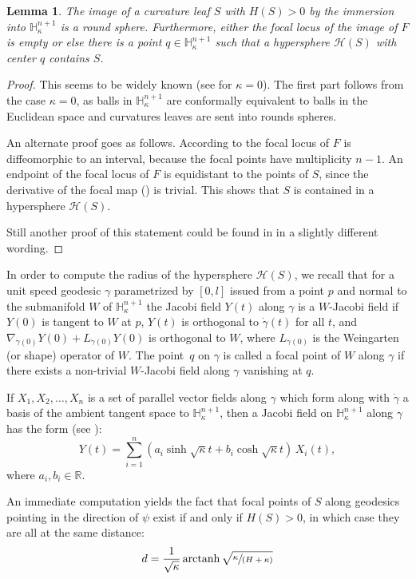 \documentclass[10pt]{amsart}
\let\mathcal\mathscr
\DeclareMathOperator{\arctanh}{arctanh}
\newcommand{\spfrac}[2]{\sfrac{#1}{(#2)}}
\newtheorem{lemma}[theorem]{Lemma}
\theoremstyle{definition}
\theoremstyle{remark}
\numberwithin{equation}{section}
\begin{document}
\begin{lemma}
The image of a curvature leaf $S$ with $H(S) >0$ by the immersion into $\mathbb H_{\kappa}^{n+1}$
is a round sphere. Furthermore, either the focal locus of the image of $F$ is empty or else there is a point
$q\in \mathbb H^{n+1}_{\kappa}$ such that a hypersphere
$\mathcal H(S)$ with center $q$ contains $S$.
\end{lemma}
\begin{proof}
This seems to be widely known (see \cite{GM} for $\kappa=0$).
The first part follows from the case $\kappa=0$, as balls in
$\mathbb H^{n+1}_{\kappa}$ are conformally equivalent
to balls in the Euclidean space and curvatures leaves are sent into rounds spheres.

An alternate proof goes as follows. According to \cite{CR} the focal locus of $F$ is diffeomorphic
to an interval, because the focal points have multiplicity $n-1$.
An endpoint of the focal locus of $F$
is equidistant to the points of $S$, since the derivative of the focal map (\cite[\S1.e,\,Th..\,2.1\,\&\,proof of Th.\,3.1]{CR}) is trivial. This shows that $S$ is contained in a
hypersphere $\mathcal H(S)$.

Still another proof of this statement
could be found in \cite{IPS} in a slightly different wording.
\end{proof}

In order to compute the radius of the hypersphere $\mathcal H(S)$, we
recall that for a unit speed geodesic $\gamma$ parametrized by
$[0,l]$ issued from a point $p$ and
normal to the submanifold $W$ of $\mathbb H_{\kappa}^{n+1}$
the Jacobi field $Y(t)$ along $\gamma$ is a $W$-Jacobi field
if $Y(0)$ is tangent to $W$ at $p$, $Y(t)$ is orthogonal to $\dot{\gamma}(t)$
for all $t$, and
$\nabla_{\dot{\gamma}(0)} Y(0) + L_{\dot{\gamma}(0)}Y(0)$ is orthogonal
to $W$, where $L_{\dot{\gamma}(0)}$ is the Weingarten (or shape)
operator of $W$. The point~$q$ on $\gamma$ is called a focal
point of $W$ along $\gamma$ if there exists a non-trivial
$W$-Jacobi field along $\gamma$ vanishing at $q$.

If $X_1,X_2,\ldots,X_n$ is a set of parallel vector fields along $\gamma$
which form along with $\dot{\gamma}$ a basis of the ambient
tangent space to $\mathbb H_{\kappa}^{n+1}$, then
a Jacobi field on $\mathbb H_{\kappa}^{n+1}$ along $\gamma$
has the form (see \cite{CE}):
\[ Y(t)=\sum_{i=1}^{n} (a_i \sinh \sqrt{\kappa} t+
b_i \cosh \sqrt{\kappa} t)\, X_i(t),\]
where $a_i,b_i\in\mathbb R$.

An immediate computation
yields the fact that focal points of $S$ along
geodesics pointing in the direction of
$\psi$ exist if and only if $H(S)>0$, in which case
they are all at the same distance:
\[d=\frac{1}{\sqrt{\kappa}}\arctanh \sqrt{\spfrac{\kappa}{H+\kappa}}\]
\end{document}
